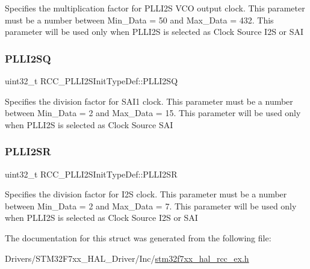Specifies the multiplication factor for P\+L\+L\+I2S V\+CO output clock. This parameter must be a number between Min\+\_\+\+Data = 50 and Max\+\_\+\+Data = 432. This parameter will be used only when P\+L\+L\+I2S is selected as Clock Source I2S or S\+AI \mbox{\label{struct_r_c_c___p_l_l_i2_s_init_type_def_a158ad7609d011d8f976556479cccb646}} 
\subsubsection{\texorpdfstring{PLLI2SQ}{PLLI2SQ}}
{\footnotesize\ttfamily uint32\+\_\+t R\+C\+C\+\_\+\+P\+L\+L\+I2\+S\+Init\+Type\+Def\+::\+P\+L\+L\+I2\+SQ}

Specifies the division factor for S\+A\+I1 clock. This parameter must be a number between Min\+\_\+\+Data = 2 and Max\+\_\+\+Data = 15. This parameter will be used only when P\+L\+L\+I2S is selected as Clock Source S\+AI \mbox{\label{struct_r_c_c___p_l_l_i2_s_init_type_def_ad49056bf464bd58c0c0692c36b70b473}} 
\subsubsection{\texorpdfstring{PLLI2SR}{PLLI2SR}}
{\footnotesize\ttfamily uint32\+\_\+t R\+C\+C\+\_\+\+P\+L\+L\+I2\+S\+Init\+Type\+Def\+::\+P\+L\+L\+I2\+SR}

Specifies the division factor for I2S clock. This parameter must be a number between Min\+\_\+\+Data = 2 and Max\+\_\+\+Data = 7. This parameter will be used only when P\+L\+L\+I2S is selected as Clock Source I2S or S\+AI 

The documentation for this struct was generated from the following file\+:\begin{DoxyCompactItemize}
\item 
Drivers/\+S\+T\+M32\+F7xx\+\_\+\+H\+A\+L\+\_\+\+Driver/\+Inc/\mbox{\hyperlink{stm32f7xx__hal__rcc__ex_8h}{stm32f7xx\+\_\+hal\+\_\+rcc\+\_\+ex.\+h}}\end{DoxyCompactItemize}
